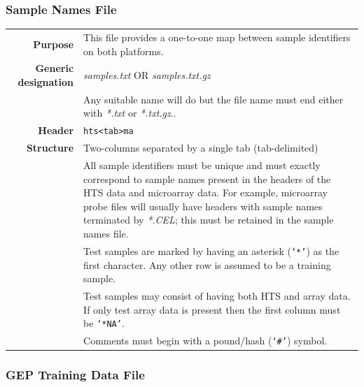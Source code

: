 \documentclass[a4paper,12pt]{article}
\begin{document}
\subsubsection{Sample Names File}
\label{tiep:sample}

\begin{tabular}{rp{12cm}}
\textbf{Purpose} & This file provides a one-to-one map between sample identifiers on both platforms. \\
\textbf{Generic designation} & \textit{samples.txt} OR \textit{samples.txt.gz} \\
   & Any suitable name will do but the file name must end either with \textit{*.txt} or \textit{*.txt.gz}.. \\
\textbf{Header} & \texttt{hts\textless tab\textgreater ma} \\
\textbf{Structure} & Two-columns separated by a single tab (tab-delimited) \\
  & All sample identifiers must be unique and must exactly correspond to sample names present in the headers of the HTS data and microarray data. For example, microarray probe files will usually have headers with sample names terminated by \textit{*.CEL}; this must be retained in the sample names file. \\
  & Test samples are marked by having an asterisk (\texttt{`*'}) as the first character. Any other row is assumed to be a training sample. \\
  & Test samples may consist of having both HTS and array data. If only test array data is present then the first column must be \texttt{`*NA'}. \\
  & Comments must begin with a pound/hash (\texttt{`\#'}) symbol. \\
\end{tabular}

\subsubsection{GEP Training Data File}
\label{tiep:gep_train}
\end{document}
